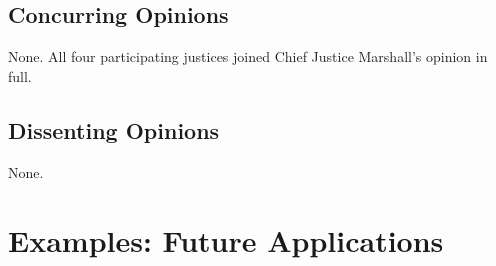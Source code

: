 \documentclass[12pt]{article}
\begin{document}
\subsection{Concurring Opinions}

None. All four participating justices joined Chief Justice Marshall's opinion in full.

\subsection{Dissenting Opinions}

None.

\section{Examples: Future Applications}
\end{document}
